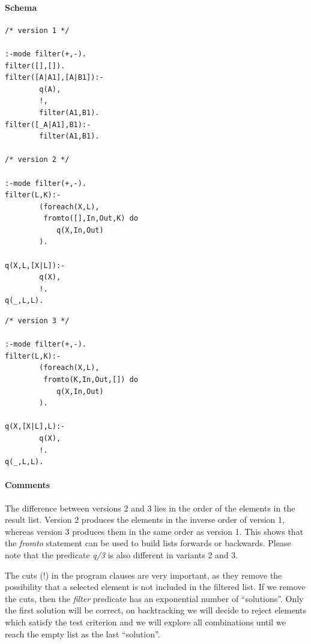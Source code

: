\documentclass[a4paper,12pt]{report}
\begin{document}
\paragraph{Schema}
\begin{verbatim}
/* version 1 */

:-mode filter(+,-).
filter([],[]).
filter([A|A1],[A|B1]):-
        q(A),
        !,
        filter(A1,B1).
filter([_A|A1],B1):-
        filter(A1,B1).

/* version 2 */

:-mode filter(+,-).
filter(L,K):-
        (foreach(X,L),
         fromto([],In,Out,K) do
            q(X,In,Out)
        ).

q(X,L,[X|L]):-
        q(X),
        !.
q(_,L,L).
\end{verbatim}
\pagebreak
\begin{verbatim}
/* version 3 */

:-mode filter(+,-).
filter(L,K):-
        (foreach(X,L),
         fromto(K,In,Out,[]) do
            q(X,In,Out)
        ).

q(X,[X|L],L):-
        q(X),
        !.
q(_,L,L).
\end{verbatim}
\paragraph{Comments}
The difference between versions 2 and 3 lies in the order of the elements in the result list. Version 2 produces the elements in the inverse order of version 1, whereas version 3 produces them in the same order as version 1. This shows that the {\it fromto} statement can be used to build lists forwards or backwards. Please note that the predicate {\it q/3} is also different in variants 2 and 3.

The cuts (!) in the program clauses are very important, as they remove the possibility that a selected element is not included in the filtered list. If we remove the cuts, then the {\it filter} predicate has an exponential number of ``solutions''. Only the first solution will be correct, on backtracking we will decide to reject elements which satisfy the test criterion and we will explore all combinations until we reach the empty list as the last ``solution''.
\pagebreak
\end{document}
